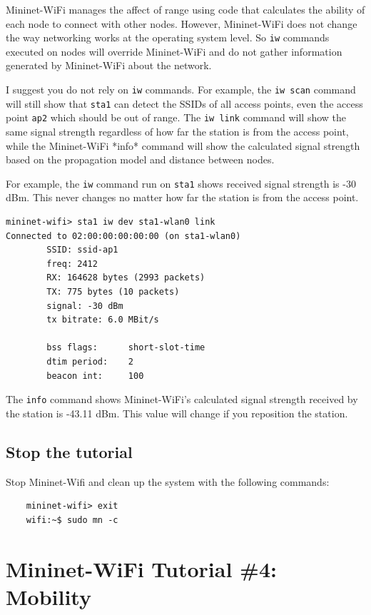Mininet-WiFi manages the affect of range using code that calculates the ability of each node to connect with other nodes. However, Mininet-WiFi does not change the way networking works at the operating system level. So \texttt{iw} commands executed on nodes will override Mininet-WiFi and do not gather information generated by Mininet-WiFi about the network.

I suggest you do not rely on \texttt{iw} commands. For example, the \texttt{iw scan} command will still show that \texttt{sta1} can detect the SSIDs of all access points, even the access point \texttt{ap2} which should be out of range. The \texttt{iw link} command will show the same signal strength regardless of how far the station is from the access point, while the Mininet-WiFi *info* command will show the calculated signal strength based on the propagation model and distance between nodes.

For example, the \texttt{iw} command run on \texttt{sta1} shows received signal strength is -30 dBm. This never changes no matter how far the station is from the access point.


\begin{verbatim}
mininet-wifi> sta1 iw dev sta1-wlan0 link
Connected to 02:00:00:00:00:00 (on sta1-wlan0)
        SSID: ssid-ap1
        freq: 2412
        RX: 164628 bytes (2993 packets)
        TX: 775 bytes (10 packets)
        signal: -30 dBm
        tx bitrate: 6.0 MBit/s

        bss flags:      short-slot-time
        dtim period:    2
        beacon int:     100
\end{verbatim}
    

The \texttt{info} command shows Mininet-WiFi's calculated signal strength received by the station is -43.11 dBm. This value will change if you reposition the station.


\subsection{Stop the tutorial}

Stop Mininet-Wifi and clean up the system with the following commands:


\begin{verbatim}
    mininet-wifi> exit
    wifi:~$ sudo mn -c
\end{verbatim}

\section{Mininet-WiFi Tutorial \#4: Mobility}

